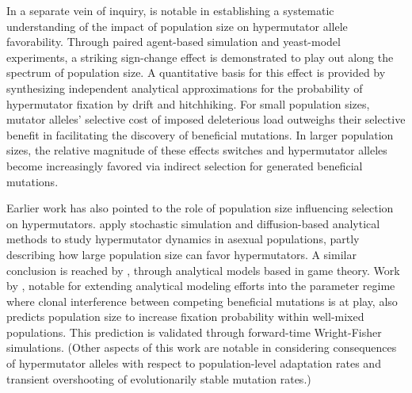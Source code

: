 In a separate vein of inquiry, \citet{raynes2018sign} is notable in establishing a systematic understanding of the impact of population size on hypermutator allele favorability.
Through paired agent-based simulation and yeast-model experiments, a striking sign-change effect is demonstrated to play out along the spectrum of population size.
A quantitative basis for this effect is provided by synthesizing independent analytical approximations for the probability of hypermutator fixation by drift and hitchhiking.
For small population sizes, mutator alleles' selective cost of imposed deleterious load outweighs their selective benefit in facilitating the discovery of beneficial mutations.
In larger population sizes, the relative magnitude of these effects switches and hypermutator alleles become increasingly favored via indirect selection for generated beneficial mutations.

Earlier work has also pointed to the role of population size influencing selection on hypermutators.
\citet{wylie2009fixation} apply stochastic simulation and diffusion-based analytical methods to study hypermutator dynamics in asexual populations, partly describing how large population size can favor hypermutators.
A similar conclusion is reached by \citet{andre2006evolution}, through analytical models based in game theory.
Work by \citet{good2016evolution}, notable for extending analytical modeling efforts into the parameter regime where clonal interference between competing beneficial mutations is at play, also predicts population size to increase fixation probability within well-mixed populations.
This prediction is validated through forward-time Wright-Fisher simulations.
(Other aspects of this work are notable in considering consequences of hypermutator alleles with respect to population-level adaptation rates and transient overshooting of evolutionarily stable mutation rates.)


